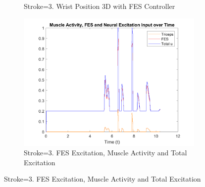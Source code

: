 \begin{landscape}
\begin{figure}[ht]
\begin{subfigure}[b]{0.33\textwidth}
            \caption{Stroke=3. Wrist Position 3D with FES Controller}
        \end{subfigure}
        \hfill
        \begin{subfigure}[b]{0.33\textwidth}
            \centering
            \includegraphics[width=\linewidth]{Pictures/Results/Controller/Stroke3/6_fes.png}
            \caption{Stroke=3. FES Excitation, Muscle Activity and Total Excitation}
        \end{subfigure}
        
        \vspace{2pt} %
    

\end{figure}
\end{landscape}
